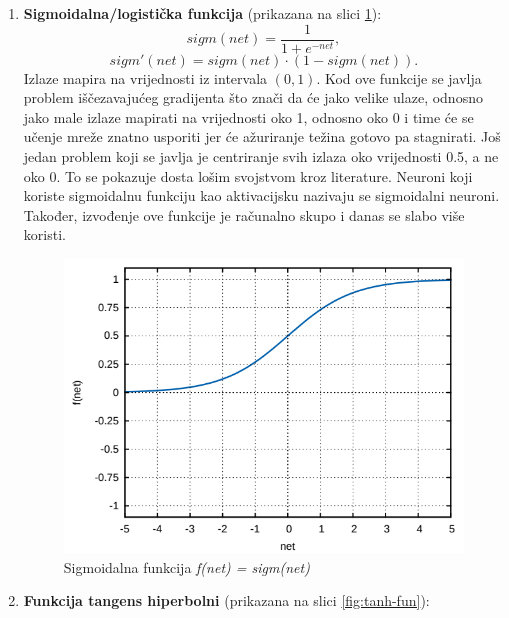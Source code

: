 \documentclass[times, utf8, zavrsni]{fer}
\begin{document}
\begin{enumerate}
    \item \textbf{Sigmoidalna/logistička funkcija} (prikazana na slici \ref{fig:sigm-fun}):
    \begin{equation}
        \label{eq:sigm}
        sigm(net) = \frac{1}{1 + e^{-net}},
    \end{equation}
    \begin{equation}
        \label{eq:sigm-der}
        sigm'(net) = sigm(net) \cdot (1 - sigm(net)).
    \end{equation}
    Izlaze mapira na vrijednosti iz intervala $(0, 1)$. Kod ove funkcije se javlja problem iščezavajućeg gradijenta  što znači da će jako velike ulaze, odnosno jako male izlaze mapirati na vrijednosti oko 1, odnosno oko 0 i time će se učenje mreže znatno usporiti jer će ažuriranje težina gotovo pa stagnirati. Još jedan problem koji se javlja je centriranje svih izlaza oko vrijednosti 0.5, a ne oko 0. To se pokazuje dosta lošim svojstvom kroz literature. Neuroni koji koriste sigmoidalnu funkciju kao aktivacijsku nazivaju se sigmoidalni neuroni. Također, izvođenje ove funkcije je računalno skupo i danas se slabo više koristi.
    \begin{figure}[H]
        \centering
        \includegraphics[scale=0.5]{img/sigm-fun.png}
        \caption[Caption for LOF]{Sigmoidalna funkcija \textit{f(net) = sigm(net)}\footnotemark}
        \label{fig:sigm-fun}
    \end{figure}
    \item \textbf{Funkcija tangens hiperbolni} (prikazana na slici \ref{fig:tanh-fun}):

\end{enumerate}
\end{document}
